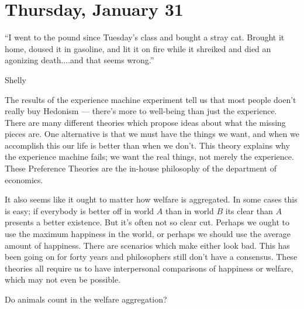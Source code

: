 
\section{Thursday, January 31}

\epigraph{``I went to the pound since Tuesday's class and bought a stray cat. Brought it home, doused it in gasoline, and lit it on fire while it shreiked and died an agonizing death....and that seems wrong.''}{Shelly}

The results of the experience machine experiment tell us that most people doen't really buy Hedonism --- there's more to well-being than just the experience. There are many different theories which propose ideas about what the missing pieces are. One alternative is that we must have the things we want, and when we accomplish this our life is better than when we don't. This theory explains why the experience machine fails; we want the real things, not merely the experience. These Preference Theories are the in-house philosophy of the department of economics.

It also seems like it ought to matter how welfare is aggregated. In some cases this is easy; if everybody is better off in world $A$ than in world $B$ its clear than $A$ presents a better existence. But it's often not so clear cut. Perhaps we ought to use the maximum happiness in the world, or perhaps we should use the average amount of happiness. There are scenarios which make either look bad. This has been going on for forty years and philosophers still don't have a consensus. These theories all require us to have interpersonal comparisons of happiness or welfare, which may not even be possible.

\begin{problem}
Do animals count in the welfare aggregation?
\end{problem}